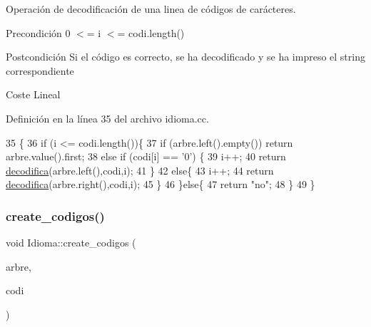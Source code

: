 Operación de decodificación de una linea de códigos de carácteres. 

\begin{DoxyPrecond}{Precondición}
0 $<$= i $<$= codi.\+length() 
\end{DoxyPrecond}
\begin{DoxyPostcond}{Postcondición}
Si el código es correcto, se ha decodificado y se ha impreso el string correspondiente 
\end{DoxyPostcond}
\begin{DoxyParagraph}{Coste}
Lineal 
\end{DoxyParagraph}


Definición en la línea 35 del archivo idioma.\+cc.


\begin{DoxyCode}
35                                                                                      \{
36   \textcolor{keywordflow}{if} (i <= codi.length())\{
37     \textcolor{keywordflow}{if} (arbre.left().empty()) \textcolor{keywordflow}{return} arbre.value().first;
38     \textcolor{keywordflow}{else} \textcolor{keywordflow}{if} (codi[i] == \textcolor{charliteral}{'0'}) \{
39       i++;
40       \textcolor{keywordflow}{return} \hyperlink{class_idioma_a225fb55a6732d07e61bf310f5f29aa0e}{decodifica}(arbre.left(),codi,i);
41     \}
42     \textcolor{keywordflow}{else}\{
43       i++;
44       \textcolor{keywordflow}{return} \hyperlink{class_idioma_a225fb55a6732d07e61bf310f5f29aa0e}{decodifica}(arbre.right(),codi,i);
45     \}
46   \}\textcolor{keywordflow}{else}\{
47     \textcolor{keywordflow}{return} \textcolor{stringliteral}{"no"};
48   \}
49 \}
\end{DoxyCode}
\mbox{\label{class_idioma_a30aeaf1fc288edfcb09a00e47cad834a}} 
\subsubsection{\texorpdfstring{create\+\_\+codigos()}{create\_codigos()}}
{\footnotesize\ttfamily void Idioma\+::create\+\_\+codigos (\begin{DoxyParamCaption}\item[{const Bin\+Tree$<$ pair$<$ string, int $>$$>$ \&}]{arbre,  }\item[{string \&}]{codi }\end{DoxyParamCaption})\hspace{0.3cm}{\ttfamily [private]}}



